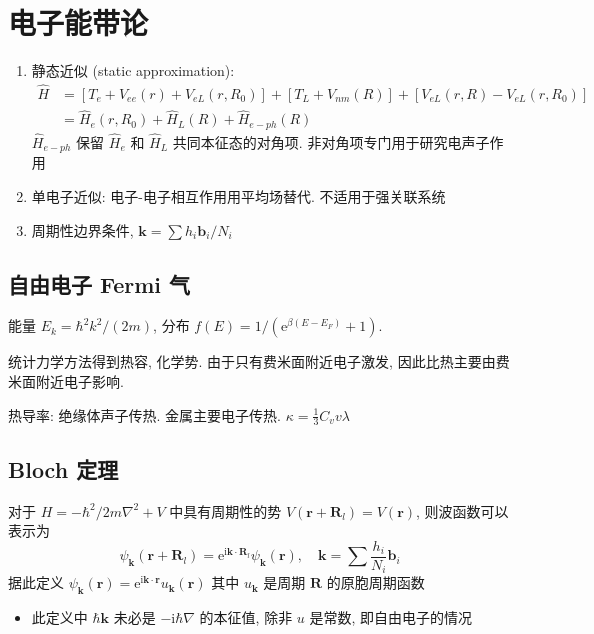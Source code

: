 \documentclass[11pt,a4paper]{article}%
\numberwithin{equation}{section}%
\renewcommand*{\vec}[1]{\bm{#1}}%
\newcommand\mi{\mathrm{i}}
\newcommand\e{\mathrm{e}}%
\begin{document}
\section{电子能带论} %
\label{sec:elec_band}
\begin{enumerate}
	\item 静态近似 (static approximation): 
	\begin{align}
		\hat H &= [T_e + V_{ee}(r) + V_{eL}(r,R_0)] + [T_L + V_{nm}(R)] + [V_{eL}(r,R) - V_{eL}(r,R_0)]  \\
		&= \hat H_e(r,R_0) + \hat H_L(R) + \hat H_{e-ph}(R)
	\end{align}
	$\hat H_{e-ph}$ 保留 $\hat H_e$ 和 $\hat H_L$ 共同本征态的对角项. 非对角项专门用于研究电声子作用
	\item 单电子近似: 电子-电子相互作用用平均场替代. 不适用于强关联系统
	\item 周期性边界条件, $\vec k = \sum h_i \vec b_i / N_i$
\end{enumerate}
\subsection{自由电子 Fermi 气} %
\label{sub:free_e_fermi_gas}
能量 $E_k =\hbar^2 k^2/(2m)$, 分布 $f(E) = 1/(\e^{\beta(E-E_F)}+1)$.

统计力学方法得到热容, 化学势. 由于只有费米面附近电子激发, 因此比热主要由费米面附近电子影响.

热导率: 绝缘体声子传热. 金属主要电子传热. $\kappa = \frac 13 C_v v\lambda$
\subsection{Bloch 定理} %
\label{sub:bloch_thm}
对于 $H = -\hbar^2/2m\nabla^2 + V$ 中具有周期性的势 $V(\vec r + \vec R_l) = V(\vec r)$, 则波函数可以表示为
\begin{equation}
	\psi_{\vec k}(\vec r + \vec R_l) = \e^{\mi\vec k\cdot\vec R_l}\psi_{\vec k}(\vec r),
	\quad \vec k = \sum \frac{h_i}{N_i}\vec b_i
\end{equation}
据此定义 $\psi_{\vec k}(\vec r) = \e^{\mi\vec k\cdot\vec r}u_{\vec k}(\vec r)$ 其中 $u_{\vec k}$ 是周期 $\vec R$ 的原胞周期函数
\begin{itemize}
	\item 此定义中 $\hbar\vec k$ 未必是 $-\mi\hbar\nabla$ 的本征值, 除非 $u$ 是常数, 即自由电子的情况
\end{itemize}
\end{document}
